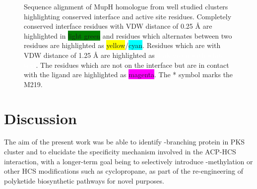 			\setlength\fboxsep{5pt}
			\setlength\fboxrule{1.5pt}
			\begin{figure} [!]
			\centering
			\caption[Sequence alignment of MupH homologue from well studied clusters highlighting conserved interface and active site residues.]{Sequence alignment of MupH homologue from well studied clusters highlighting conserved interface and active site residues. Completely conserved interface residues with VDW distance of 0.25 \AA{} are highlighted in \colorbox{green}{light green} and residues which alternates between two residues are highlighted as \colorbox{yellow}{yellow}/\colorbox{cyan}{cyan}. Residues which are with VDW distance of 1.25 \AA{} are highlighted as \colorbox{OliveGreen}{\textcolor{white}{dark green with white text}}. The residues which are not on the interface but are in contact with the ligand are highlighted as \colorbox{magenta}{magenta}. The * symbol marks the M219.}
			\label{fig:LtoMBatC}
			\end{figure}		
			
\newpage	
\section{Discussion}
\label{sec:discussion}
The aim of the present work was be able to identify \bet-branching protein in PKS cluster and to elucidate the specificity mechanism involved in the ACP-HCS interaction, with a longer-term goal being to selectively introduce \bet-methylation or other HCS modifications such as cyclopropane, as part of the re-engineering of polyketide biosynthetic pathways for novel purposes.


